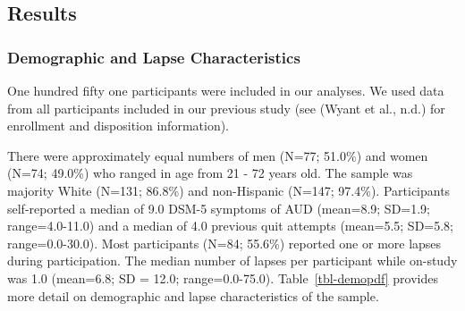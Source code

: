 \documentclass[
]{agujournal2019}
\begin{document}
\subsection{Results}\label{results}

\subsubsection{Demographic and Lapse
Characteristics}\label{demographic-and-lapse-characteristics}

One hundred fifty one participants were included in our analyses. We
used data from all participants included in our previous study (see
(Wyant et al., n.d.) for enrollment and disposition information).

There were approximately equal numbers of men (N=77; 51.0\%) and women
(N=74; 49.0\%) who ranged in age from 21 - 72 years old. The sample was
majority White (N=131; 86.8\%) and non-Hispanic (N=147; 97.4\%).
Participants self-reported a median of 9.0 DSM-5 symptoms of AUD
(mean=8.9; SD=1.9; range=4.0-11.0) and a median of 4.0 previous quit
attempts (mean=5.5; SD=5.8; range=0.0-30.0). Most participants (N=84;
55.6\%) reported one or more lapses during participation. The median
number of lapses per participant while on-study was 1.0 (mean=6.8; SD =
12.0; range=0.0-75.0). {Table~\ref{tbl-demopdf}} provides more detail on
demographic and lapse characteristics of the sample.
\end{document}

